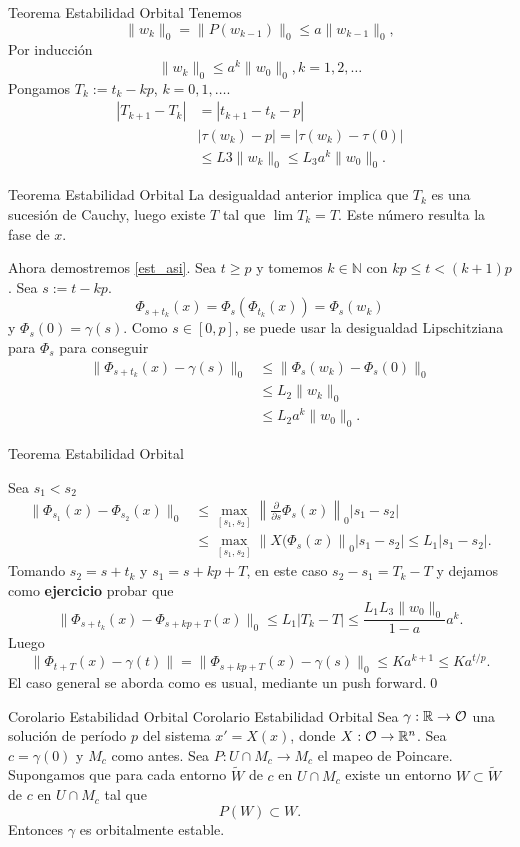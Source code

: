 {Teorema Estabilidad Orbital}
Tenemos
\[\|w_k\|_0=\|P(w_{k-1})\|_0\leq a\|w_{k-1}\|_0,\]
Por inducción
\[\|w_k\|_0 \leq a^k\|w_{0}\|_0, k=1,2,\ldots\]
Pongamos $T_k:=t_k-kp$, $k=0,1,\ldots$.
\[\begin{split}
   |T_{k+1}-T_k|&=|t_{k+1}-t_k-p|\\
   &|\tau(w_k)-p|=|\tau(w_k)-\tau(0)|\\
   &\leq L3\|w_k\|_0\leq L_3a^k\|w_0\|_0.
  \end{split}
\]



{Teorema Estabilidad Orbital}
La desigualdad anterior implica que $T_k$ es una sucesión de Cauchy, luego existe $T$ tal que $\lim T_k=T$. Este número resulta la fase de $x$. 

Ahora demostremos  \eqref{est_asi}. Sea $t\geq p$ y tomemos $k\in\mathbb{N}$ con $kp\leq t<(k+1)p$. Sea $s:=t-kp$. 
\[\Phi_{s+t_k}(x)=\Phi_{s}\left(\Phi_{t_k}(x)\right)=\Phi_{s}(w_k)\]
y $\Phi_s(0)=\gamma(s)$. Como $s\in [0,p]$, se puede usar la desigualdad Lipschitziana para $\Phi_s$ para conseguir
\[\begin{split}
  \|\Phi_{s+t_k}(x)-\gamma(s)\|_0 &\leq \|\Phi_s(w_k)-\Phi_s(0)\|_0\\&\leq L_2\|w_k\|_0\\&\leq L_2a^k\|w_0\|_0. 
  \end{split}
\]




{Teorema Estabilidad Orbital}

Sea $s_1<s_2$  
\[\begin{split}
   \|\Phi_{s_1}(x)-\Phi_{s_2}(x)\|_0 &\leq \max_{[s_1,s_2]} \left\|\frac{\partial}{\partial s} \Phi_s(x) \right\|_0|s_1-s_2|\\
 &\leq \max_{[s_1,s_2]} \left\| X(\Phi_s(x) \right\|_0|s_1-s_2|\leq L_1 |s_1-s_2|.
  \end{split}
\]
Tomando $s_2=s+t_k$ y $s_1=s+kp+T$, en este caso $s_2-s_1=T_k-T$ y dejamos como \textbf{ejercicio} probar que
\[ 
   \|\Phi_{s+t_k}(x)-\Phi_{s+kp+T}(x)\|_0 \leq L_1 |T_k-T|\leq \frac{L_1L_3\|w_0\|_0}{1-a}a^k.
 \]
Luego
\[ \|\Phi_{t+T}(x)-\gamma(t)\|=\|\Phi_{s+kp+T}(x)-\gamma(s)\|_0\leq Ka^{k+1}\leq Ka^{t/p}.   \]
El caso general se aborda como es usual, mediante un push forward.\qed


{Corolario Estabilidad Orbital}
{Corolario Estabilidad Orbital} 
 Sea $\gamma:\mathbb{R}\to\mathcal{O}$ una solución de período $p$ del sistema $x'=X(x)$, donde $X:\mathcal{O}\to \mathbb{R}^n$. Sea $c=\gamma(0)$ y $M_c$ como antes. 
Sea $P:U\cap M_c\to M_c$ el mapeo de Poincare. Supongamos que para cada entorno $\tilde{W}$ de $c$  en $U\cap M_c$ existe un entorno $W\subset\tilde{W}$
de $c$  en $U\cap M_c$ tal que
\[P(W)\subset W.\]
Entonces $\gamma$ es orbitalmente estable. 





